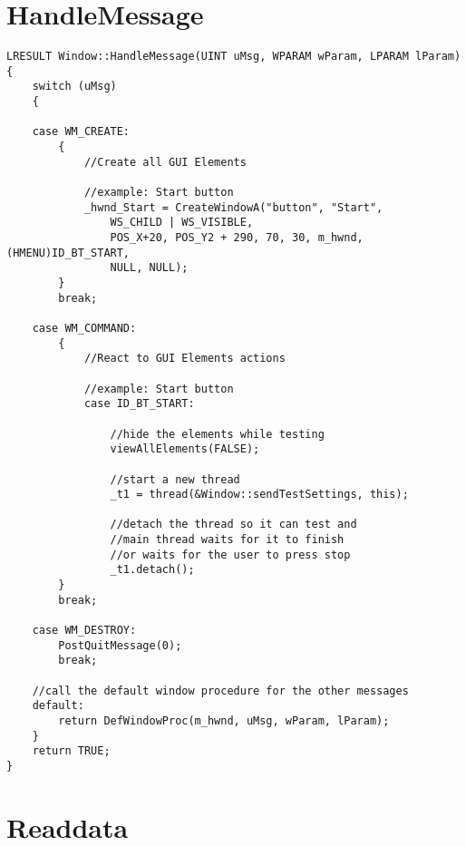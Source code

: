 \newpage
\section{HandleMessage}\label{HandleMessageCode}

		
\begin{lstlisting}	
LRESULT Window::HandleMessage(UINT uMsg, WPARAM wParam, LPARAM lParam)
{
    switch (uMsg)
    {

    case WM_CREATE:
        {
            //Create all GUI Elements
            
            //example: Start button
            _hwnd_Start = CreateWindowA("button", "Start",
				WS_CHILD | WS_VISIBLE,
				POS_X+20, POS_Y2 + 290, 70, 30, m_hwnd, (HMENU)ID_BT_START,
				NULL, NULL);
        }
        break;
        
    case WM_COMMAND:
        {
            //React to GUI Elements actions
            
            //example: Start button
            case ID_BT_START:

				//hide the elements while testing
				viewAllElements(FALSE);

				//start a new thread
				_t1 = thread(&Window::sendTestSettings, this);
				
				//detach the thread so it can test and
				//main thread waits for it to finish
				//or waits for the user to press stop
				_t1.detach();
        }
        break;
        
    case WM_DESTROY:
        PostQuitMessage(0);
        break;

	//call the default window procedure for the other messages
    default:
        return DefWindowProc(m_hwnd, uMsg, wParam, lParam);
    }
    return TRUE;
}

\end{lstlisting}


\newpage
\section{Readdata}\label{ReadDataCode}

